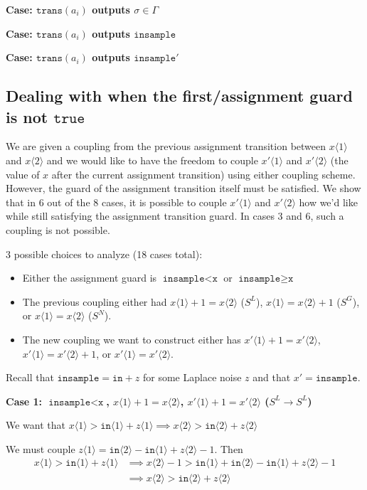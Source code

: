 \documentclass[12pt]{article}
\newcommand{\gguard}[1][x]{\texttt{insample}\geq \texttt{#1}}
\newcommand{\lguard}[1][x]{\texttt{insample} < \texttt{#1}}
\newcommand{\brangle}[1]{\langle #1 \rangle}
\newcommand{\trans}{\texttt{trans}}
\theoremstyle{definition}
\begin{document}
\textbf{Case: $\trans(a_i)$ outputs $\sigma \in \Gamma$}

\textbf{Case: $\trans(a_i)$ outputs $\texttt{insample}$}

\textbf{Case: $\trans(a_i)$ outputs $\texttt{insample}'$}

\subsection{Dealing with when the first/assignment guard is not \texorpdfstring{$\texttt{true}$}{true} }\label{subsectionfirstguardnottrue}

We are given a coupling from the previous assignment transition between $x \brangle{1}$ and $x \brangle{2}$ and we would like to have the freedom to couple $x'\brangle{1}$ and $x'\brangle{2}$ (the value of $x$ after the current assignment transition) using either coupling scheme. However, the guard of the assignment transition itself must be satisfied. 
We show that in 6 out of the 8 cases, it is possible to couple $x'\brangle{1}$ and $x'\brangle{2}$ how we'd like while still satisfying the assignment transition guard. In cases 3 and 6, such a coupling is not possible.

3 possible choices to analyze (18 cases total):
\begin{itemize}
	\item Either the assignment guard is $\lguard$ or $\gguard$
	\item The previous coupling either had $x\brangle{1} + 1 = x \brangle{2}$ ($S^L$), $x\brangle{1} = x \brangle{2}+1$ ($S^G$), or $x\brangle{1} = x\brangle{2}$ ($S^N$).
	\item The new coupling we want to construct either has $x'\brangle{1} + 1 = x' \brangle{2}$, $x'\brangle{1} = x' \brangle{2}+1$, or $x'\brangle{1} = x'\brangle{2}$.
\end{itemize}

Recall that $\texttt{insample} = \texttt{in} + z$ for some Laplace noise $z$ and that $x' = \texttt{insample}$.

\textbf{Case 1: $\lguard$, $x\langle 1 \rangle + 1 = x \langle 2\rangle$, $x'\langle 1 \rangle + 1 = x' \langle 2\rangle$ ($S^L\to S^L$)}

We want that $x\langle 1 \rangle > \texttt{in}\brangle{1} + z\brangle{1}\implies x \brangle{2} > \texttt{in}\brangle{2} + z\brangle{2}$

We must couple $z\brangle{1} =\texttt{in}\brangle{2}-\texttt{in}\brangle{1} +z\brangle{2}-1$.
Then \begin{align*}
	x\langle 1 \rangle > \texttt{in}\brangle{1} + z\brangle{1}&\implies x\brangle{2}-1 > \texttt{in}\brangle{1} + \texttt{in}\brangle{2}-\texttt{in}\brangle{1} +z\brangle{2}-1\\
	&\implies x\brangle{2} > \texttt{in}\brangle{2} + z\brangle{2}
\end{align*}
\end{document}
